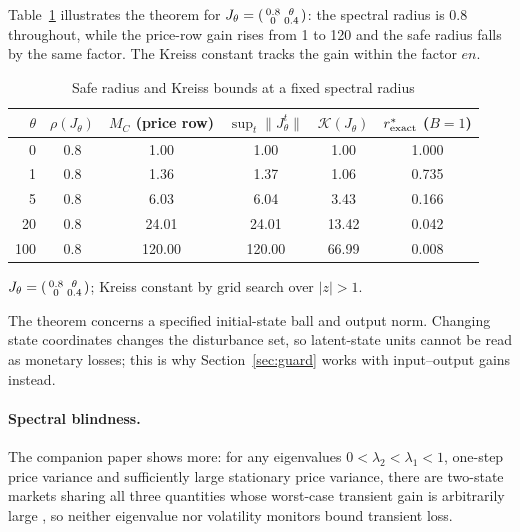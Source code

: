 Table~\ref{tab:kreiss} illustrates the theorem for $J_\theta=\begin{psmallmatrix}0.8&\theta\\0&0.4\end{psmallmatrix}$: the spectral radius is $0.8$ throughout, while the price-row gain rises from 1 to 120 and the safe radius falls by the same factor. The Kreiss constant tracks the gain within the factor $en$.

\begin{table}[t]\centering\small
\begin{threeparttable}
\caption{Safe radius and Kreiss bounds at a fixed spectral radius}\label{tab:kreiss}
\begin{tabular}{rccccc}
\toprule
$\theta$ & $\rho(J_\theta)$ & $M_C$ (price row) & $\sup_t\|J_\theta^t\|$ & $\mathcal K(J_\theta)$ & $r^*_{\rm exact}$ ($B=1$)\\
\midrule
0 & 0.8 & 1.00 & 1.00 & 1.00 & 1.000\\
1 & 0.8 & 1.36 & 1.37 & 1.06 & 0.735\\
5 & 0.8 & 6.03 & 6.04 & 3.43 & 0.166\\
20 & 0.8 & 24.01 & 24.01 & 13.42 & 0.042\\
100 & 0.8 & 120.00 & 120.00 & 66.99 & 0.008\\
\bottomrule
\end{tabular}
\begin{tablenotes}\footnotesize\item $J_\theta=\begin{psmallmatrix}0.8&\theta\\0&0.4\end{psmallmatrix}$; Kreiss constant by grid search over $|z|>1$. \end{tablenotes}
\end{threeparttable}
\end{table}

The theorem concerns a specified initial-state ball and output norm. Changing state coordinates changes the disturbance set, so latent-state units cannot be read as monetary losses; this is why Section~\ref{sec:guard} works with input--output gains instead.

\paragraph{Spectral blindness.} The companion paper shows more: for any eigenvalues $0<\lambda_2<\lambda_1<1$, one-step price variance and sufficiently large stationary price variance, there are two-state markets sharing all three quantities whose worst-case transient gain is arbitrarily large \citep[spectral-blindness theorem]{niroula2026}, so neither eigenvalue nor volatility monitors bound transient loss.

